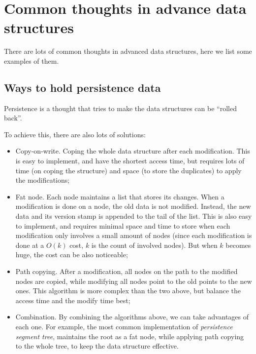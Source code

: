 \documentclass[scheme=plain,12pt]{ctexart}
\begin{document}
    \section{Common thoughts in advance data structures}

    There are lots of common thoughts in advanced data structures, here we list some examples of them.

    \subsection{Ways to hold persistence data}

    Persistence is a thought that tries to make the data structures can be ``rolled back''.

    To achieve this, there are also lots of solutions:

    \begin{itemize}
        \item Copy-on-write. Coping the whole data structure after each modification. This is
              easy to implement, and have the shortest access time, but requires lots of time
              (on coping the structure) and space (to store the duplicates) to apply the
              modifications;
        \item Fat node. Each node maintains a list that stores its changes. When a modification
              is done on a node, the old data is not modified. Instead, the new data and its
              version stamp is appended to the tail of the list. This is also easy to implement,
              and requires minimal space and time to store when each modification only involves
              a small amount of nodes (since each modification is done at a $O(k)$ cost, $k$ is
              the count of involved nodes). But when $k$ becomes huge, the cost can be also
              noticeable;
        \item Path copying. After a modification, all nodes on the path to the modified nodes
              are copied, while modifying all nodes point to the old points to the new ones.
              This algorithm is more complex than the two above, but balance the access time
              and the modify time best;
        \item Combination. By combining the algorithms above, we can take advantages of each one.
              For example, the most common implementation of \emph{persistence segment tree},
              maintains the root as a fat node, while applying path copying to the whole tree,
              to keep the data structure effective.
    \end{itemize}
\end{document}
